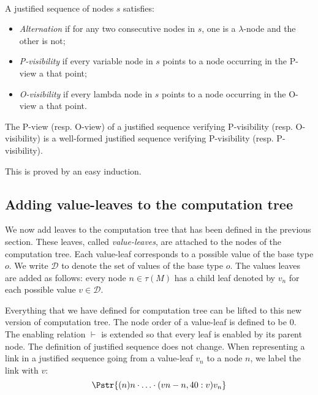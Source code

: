 \begin{dfn} \ \\
A justified sequence of nodes $s$ satisfies:
\begin{itemize}
\item \emph{Alternation} if for any two consecutive nodes in $s$, one is a $\lambda$-node
and the other is not;

\item \emph{P-visibility} if every variable node in $s$ points to a node occurring in the P-view a that point;

\item  \emph{O-visibility} if every lambda node in $s$ points to a node occurring in the O-view a that point.
\end{itemize}
\end{dfn}

\begin{property}
\label{proper:pview_visibility}
The P-view (resp. O-view) of a justified sequence verifying P-visibility (resp. O-visibility)
is a well-formed justified sequence verifying P-visibility (resp. P-visibility).
\end{property}
This is proved by an easy induction.

\subsection{Adding value-leaves to the computation tree}
\label{sec:adding_value_leaves}

We now add leaves to the computation tree that has been defined in the previous section.
These leaves, called \emph{value-leaves}, are attached to the nodes of the computation tree. Each
value-leaf corresponds to a possible value of the base type $o$.
We write $\mathcal{D}$ to denote the set of values of the base type
$o$. The values leaves are added as follows: every
node $n \in \tau(M)$ has a child leaf denoted by $v_n$ for each possible value $v \in \mathcal{D}$.


Everything that we have defined for computation tree can be lifted
to this new version of computation tree. The node order of a
value-leaf is defined to be $0$. The enabling relation $\vdash$ is
extended so that every leaf is enabled by its parent node. The
definition of justified sequence does not change.
When representing a link in a justified sequence going from a value-leaf $v_n$ to a node $n$,
we label the link with $v$:
$$
\Pstr{ (n){n} \cdot \ldots \cdot (vn-n,40:v){v_n} }
$$

